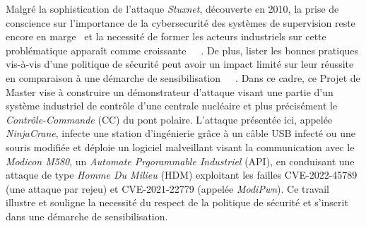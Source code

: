 \begin{frenchabstract}
Malgré la sophistication de l'attaque \emph{Stuxnet}, découverte en 2010, la prise de conscience sur l'importance de la cybersecurité des systèmes de supervision reste encore en marge~\cite{Pattanayak18} et la necessité de former les acteurs industriels sur cette problématique apparaît comme croissante~\cite{Wang22}~\cite{wong22}~\cite{cisaTraining}. De plus, lister les bonnes pratiques vis-à-vis d'une politique de sécurité peut avoir un impact limité sur leur réussite en comparaison à une démarche de sensibilisation~\cite{Rhee09}~\cite{Sitnikova13}~\cite{Angafor20}. Dans ce cadre, ce Projet de Master vise à construire un démonstrateur d'attaque visant une partie d'un système industriel de contrôle d'une centrale nucléaire et plus précisément le \emph{Contrôle-Commande} (CC) du pont polaire. L'attaque présentée ici, appelée \emph{NinjaCrane}, infecte une station d'ingénierie grâce à un câble USB infecté ou une souris modifiée et déploie un logiciel malveillant visant la communication avec le \emph{Modicon M580}, un \emph{Automate Prgorammable Industriel} (API), en conduisant une attaque de type \emph{Homme Du Milieu} (HDM) exploitant les failles CVE-2022-45789 (une attaque par rejeu) et CVE-2021-22779 (appelée \emph{ModiPwn}). Ce travail illustre et souligne la necessité du respect de la politique de sécurité et s'inscrit dans une démarche de sensibilisation.

\iffalse
For a doctoral thesis, you have to provide a French translation of the
English abstract. For other projects this is optional.
\fi
\end{frenchabstract}

\cleardoublepage